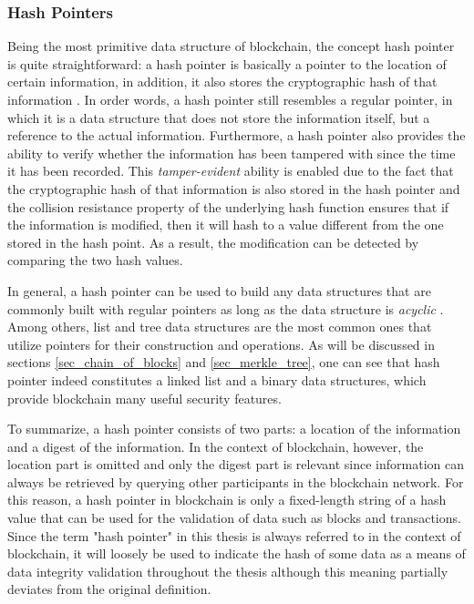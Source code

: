 \subsubsection{Hash Pointers} \label{subsubsec:hashpointer}

Being the most primitive data structure of blockchain, the concept hash pointer is quite straightforward: a hash pointer is basically a pointer to the location of certain information, in addition, it also stores the cryptographic hash of that information \cite{narayanan2016bitcoin}. In order words, a hash pointer still resembles a regular pointer, in which it is a data structure that does not store the information itself, but a reference to the actual information. Furthermore, a hash pointer also provides the ability to verify whether the information has been tampered with since the time it has been recorded. This \textit{tamper-evident} ability is enabled due to the fact that the cryptographic hash of that information is also stored in the hash pointer and the collision resistance property of the underlying hash function ensures that if the information is modified, then it will hash to a value different from the one stored in the hash point. As a result, the modification can be detected by comparing the two hash values.

In general, a hash pointer can be used to build any data structures that are commonly built with regular pointers as long as the data structure is \textit{acyclic} \cite{narayanan2016bitcoin}. Among others, list and tree data structures are the most common ones that utilize pointers for their construction and operations. As will be discussed in sections \ref{sec_chain_of_blocks} and \ref{sec_merkle_tree}, one can see that hash pointer indeed constitutes a linked list and a binary data structures, which provide blockchain many useful security features.

To summarize, a hash pointer consists of two parts: a location of the information and a digest of the information. In the context of blockchain, however, the location part is omitted and only the digest part is relevant since information can always be retrieved by querying other participants in the blockchain network. For this reason, a hash pointer in blockchain is only a fixed-length string of a hash value that can be used for the validation of data such as blocks and transactions. Since the term "hash pointer" in this thesis is always referred to in the context of blockchain, it will loosely be used to indicate the hash of some data as a means of data integrity validation throughout the thesis although this meaning partially deviates from the original definition.


